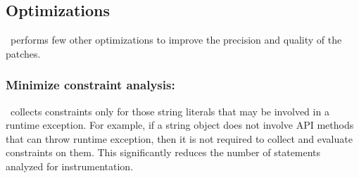 \subsection{Optimizations}
\label{subsec:optimizations}

\tool\ performs few other optimizations to improve the precision and quality
of the patches.


\subsubsection{Minimize constraint analysis: }
\label{subsubsec:minimizeConstrintInstrumentation}
%
\tool\ collects constraints only for those string literals that may be involved
in a runtime exception. For example, if a string object does not involve API
methods that can throw runtime exception, then it is not required to collect and
evaluate constraints on them. This significantly reduces the number of
statements analyzed for instrumentation.
 


